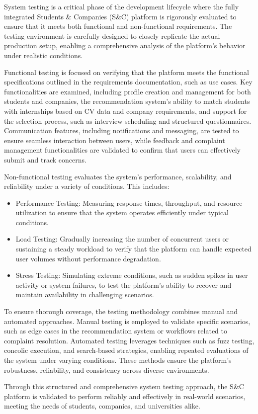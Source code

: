 System testing is a critical phase of the development lifecycle where the fully
integrated Students \& Companies (S\&C) platform is rigorously evaluated to ensure that it
meets both functional and non-functional requirements. The testing environment is carefully
designed to closely replicate the actual production setup, enabling a comprehensive analysis
of the platform's behavior under realistic conditions.

Functional testing is focused on verifying that the platform meets the functional specifications
outlined in the requirements documentation, such as use cases. Key functionalities are examined,
including profile creation and management for both students and companies, the recommendation
system’s ability to match students with internships based on CV data and company requirements,
and support for the selection process, such as interview scheduling and structured questionnaires.
Communication features, including notifications and messaging, are tested to ensure seamless
interaction between users, while feedback and complaint management functionalities are validated
to confirm that users can effectively submit and track concerns.

Non-functional testing evaluates the system’s performance, scalability, and reliability under
a variety of conditions. This includes:

\begin{itemize}
\item Performance Testing: Measuring response times, throughput, and resource utilization to ensure that the
system operates efficiently under typical conditions.
\item Load Testing: Gradually increasing the number of concurrent users or sustaining a steady workload to
verify that the platform can handle expected user volumes without performance degradation.
\item Stress Testing: Simulating extreme conditions, such as sudden spikes in user activity or system failures,
to test the platform’s ability to recover and maintain availability in challenging scenarios.
\end{itemize}

To ensure thorough coverage, the testing methodology combines manual and automated approaches.
Manual testing is employed to validate specific scenarios, such as edge cases in the recommendation
system or workflows related to complaint resolution. Automated testing leverages techniques such as
fuzz testing, concolic execution, and search-based strategies, enabling repeated evaluations of the
system under varying conditions. These methods ensure the platform’s robustness, reliability, and
consistency across diverse environments.

Through this structured and comprehensive system testing approach, the S\&C platform is validated
to perform reliably and effectively in real-world scenarios, meeting the needs of students,
companies, and universities alike.